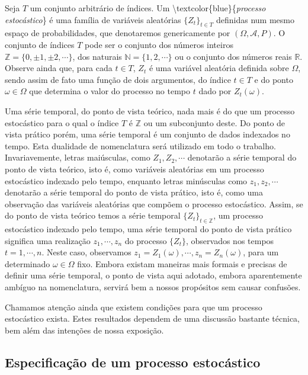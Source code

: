 \documentclass[
]{book}
\theoremstyle{definition}
\theoremstyle{definition}
\theoremstyle{definition}
\theoremstyle{remark}
\begin{document}
Seja \(T\) um conjunto arbitrário de índices. Um \textbackslash textcolor\{blue\}\{\emph{processo estocástico}\} é uma família de variáveis aleatórias \(\{Z_t\}_{t \in T}\) definidas num mesmo espaço de probabilidades, que denotaremos genericamente por \((\Omega, \mathcal A, P)\). O conjunto de índices \(T\) pode ser o conjunto dos números inteiros \(\mathbb{Z} = \{0, \pm 1, \pm 2,\cdots\}\), dos naturais \(\mathbb{N}=\{1,2,\cdots\}\) ou o conjunto dos números reais \(\mathbb{R}\). Observe ainda que, para cada \(t \in T\), \(Z_t\) é uma variável aleatória definida sobre \(\Omega\), sendo assim de fato uma função de dois argumentos, do índice \(t\in T\) e do ponto \(\omega \in \Omega\) que determina o valor do processo no tempo \(t\) dado por \(Z_t(\omega)\).

Uma série temporal, do ponto de vista teórico, nada mais é do que um processo estocástico para o qual o índice \(T\) é \(\mathbb{Z}\) ou um subconjunto deste. Do ponto de vista prático porém, uma série temporal é um conjunto de dados indexados no tempo. Esta dualidade de nomenclatura será utilizado em todo o trabalho. Invariavemente, letras maiúsculas, como \(Z_1,Z_2,\cdots\) denotarão a série temporal do ponto de vista teórico, isto é, como variáveis aleatórias em um processo estocástico indexado pelo tempo, enquanto letras minúsculas como \(z_1,z_2,\cdots\) denotarão a série temporal do ponto de vista prático, isto é, como uma observação das variáveis aleatórias que compõem o processo estocástico. Assim, se do ponto de vista teórico temos a série temporal \(\{Z_t\}_{t\in\mathbb{Z}}\), um processo estocástico indexado pelo tempo, uma série temporal do ponto de vista prático significa uma realização \(z_1,\cdots,z_n\) do processo \(\{Z_t\}\), observados nos tempos \(t=1,\cdots,n\). Neste caso, observamos \(z_1=Z_1(\omega),\cdots, z_n=Z_n(\omega)\), para um determinado \(\omega\in\Omega\) fixo. Embora existam maneiras mais formais e precisas de definir uma série temporal, o ponto de vista aqui adotado, embora aparentemente ambíguo na nomenclatura, servirá bem a nossos propósitos sem causar confusões.

Chamamos atenção ainda que existem condições para que um processo estocástico exista. Estes resultados dependem de uma discussão bastante técnica, bem além das intenções de nossa exposição.

\hypertarget{especificauxe7uxe3o-de-um-processo-estocuxe1stico}{%
\subsection{Especificação de um processo estocástico}\label{especificauxe7uxe3o-de-um-processo-estocuxe1stico}}
\end{document}
